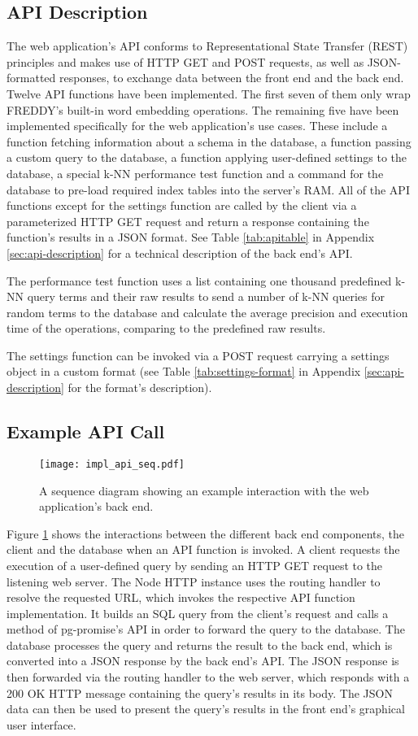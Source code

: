 \subsection{API Description}
The web application's API conforms to Representational State Transfer (REST) principles and makes use of HTTP GET and POST requests, as well as JSON-formatted responses, to exchange data between the front end and the back end. Twelve API functions have been implemented. The first seven of them only wrap FREDDY's built-in word embedding operations. The remaining five have been implemented specifically for the web application's use cases. These include a function fetching information about a schema in the database, a function passing a custom query to the database, a function applying user-defined settings to the database, a special k-NN performance test function and a command for the database to pre-load required index tables into the server's RAM. All of the API functions except for the settings function are called by the client via a parameterized HTTP GET request and return a response containing the function's results in a JSON format. See Table \ref{tab:apitable} in Appendix \ref{sec:api-description} for a technical description of the back end's API.

The performance test function uses a list containing one thousand predefined k-NN query terms and their raw results to send a number of k-NN queries for random terms to the database and calculate the average precision and execution time of the operations, comparing to the predefined raw results.

The settings function can be invoked via a POST request carrying a settings object in a custom format (see Table \ref{tab:settings-format} in Appendix \ref{sec:api-description} for the format's description).

\subsection{Example API Call}
\begin{figure}
	\centering
	\texttt{[image: impl\_api\_seq.pdf]}
	\caption{A sequence diagram showing an example interaction with the web application's back end.}
	\label{fig:api_seq}
\end{figure}
Figure \ref{fig:api_seq} shows the interactions between the different back end components, the client and the database when an API function is invoked. A client requests the execution of a user-defined query by sending an HTTP GET request to the listening web server. The Node HTTP instance uses the routing handler to resolve the requested URL, which invokes the respective API function implementation. It builds an SQL query from the client's request and calls a method of pg-promise's API in order to forward the query to the database. The database processes the query and returns the result to the back end, which is converted into a JSON response by the back end's API. The JSON response is then forwarded via the routing handler to the web server, which responds with a 200 OK HTTP message containing the query's results in its body. The JSON data can then be used to present the query's results in the front end's graphical user interface.

